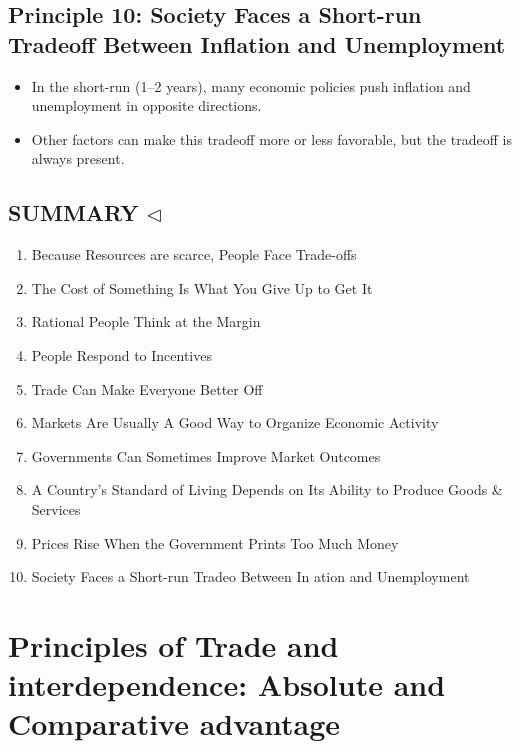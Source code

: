 \documentclass[
]{book}
\providecommand{\tightlist}{%
  \setlength{\itemsep}{0pt}\setlength{\parskip}{0pt}}
\begin{document}
\hypertarget{society-faces-a-short-run-tradeoff-between-inflation-and-unemployment}{%
\section{\texorpdfstring{\textbf{Principle 10:} Society Faces a Short-run Tradeoff Between Inflation and Unemployment}{ Society Faces a Short-run Tradeoff Between Inflation and Unemployment}}\label{society-faces-a-short-run-tradeoff-between-inflation-and-unemployment}}

\begin{itemize}
\item
  In the short-run (1--2 years), many economic policies push inflation and unemployment in opposite directions.
\item
  Other factors can make this tradeoff more or less favorable, but the tradeoff is always present.
\end{itemize}

\hypertarget{summary-triangleleft}{%
\section{\texorpdfstring{SUMMARY \(\triangleleft\)}{SUMMARY \textbackslash triangleleft}}\label{summary-triangleleft}}

\begin{enumerate}
\def\labelenumi{\arabic{enumi}.}
\tightlist
\item
  Because Resources are scarce, People Face Trade-offs
\item
  The Cost of Something Is What You Give Up to Get It
\item
  Rational People Think at the Margin
\item
  People Respond to Incentives
\item
  Trade Can Make Everyone Better Off
\item
  Markets Are Usually A Good Way to Organize Economic Activity
\item
  Governments Can Sometimes Improve Market Outcomes
\item
  A Country's Standard of Living Depends on Its Ability to Produce Goods \& Services
\item
  Prices Rise When the Government Prints Too Much Money
\item
  Society Faces a Short-run Tradeo Between In ation and Unemployment
\end{enumerate}

\hypertarget{principles-of-trade-and-interdependence-absolute-and-comparative-advantage}{%
\chapter{Principles of Trade and interdependence: Absolute and Comparative advantage}\label{principles-of-trade-and-interdependence-absolute-and-comparative-advantage}}
\end{document}
